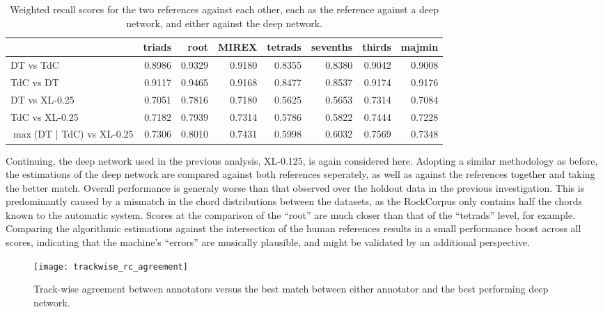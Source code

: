 \begin{table}[t]
\begin{center}
\scriptsize
\caption{Weighted recall scores for the two references against each other, each as the reference against a deep network, and either against the deep network.}

\begin{tabular}{lrrrrrrr}
\hline
         &   triads &   root &   MIREX &   tetrads &   sevenths &   thirds &   majmin \\
\hline
DT vs TdC  &  0.8986 & 0.9329 &  0.9180  &   0.8355  &    0.8380  &   0.9042  &  0.9008 \\
TdC vs DT &   0.9117 & 0.9465 &  0.9168  &   0.8477  &    0.8537 &   0.9174 &    0.9176 \\
\hline
DT vs XL-0.25  &   0.7051 & 0.7816 &  0.7180  &   0.5625   &   0.5653  &  0.7314  &  0.7084 \\
TdC vs XL-0.25  & 0.7182 & 0.7939 & 0.7314  &   0.5786  &    0.5822 &   0.7444 &   0.7228 \\
\hline
$\max$(DT | TdC) vs XL-0.25 & 0.7306 & 0.8010 & 0.7431  &   0.5998  &    0.6032 &   0.7569  &  0.7348\\
\hline
\end{tabular}
\label{tab:rc_agreement}
\end{center}
\end{table}

Continuing, the deep network used in the previous analysis, XL-0.125, is again considered here.
Adopting a similar methodology as before, the estimations of the deep network are compared against both references seperately, as well as against the references together and taking the better match.
Overall performance is generaly worse than that observed over the holdout data in the previous investigation.
This is predominantly caused by a mismatch in the chord distributions between the datasets, as the RockCorpus only contains half the chords known to the automatic system.
Scores at the comparison of the ``root'' are much closer than that of the ``tetrads'' level, for example.
Comparing the algorithmic estimations against the intersection of the human references results in a small performance boost across all scores, indicating that the machine's ``errors'' are musically plausible, and might be validated by an additional perspective.


\begin{figure}[t!]
\centering
\texttt{[image: trackwise\_rc\_agreement]}
\caption{Track-wise agreement between annotators versus the best match between either annotator and the best performing deep network.}
\label{fig:trackwise_rc_agreement}
\end{figure}

